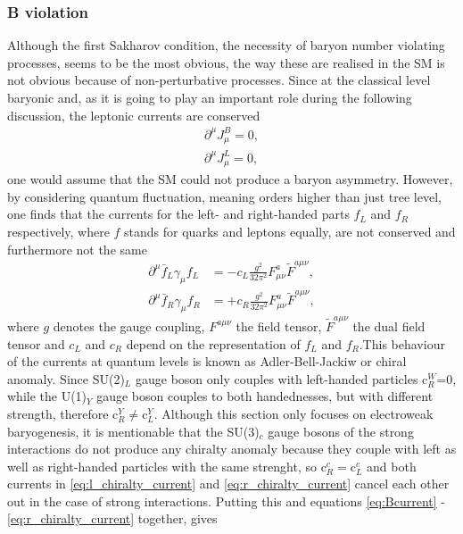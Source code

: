 \subsubsection{B violation}
Although the first Sakharov condition, the necessity of baryon number violating processes, seems to be the most obvious, the way these are realised in the SM is not obvious because of non-perturbative processes. \newline\indent
Since at the classical level baryonic and, as it is going to play an important role during the following discussion, the leptonic currents are  conserved
\begin{align}
	\partial^\mu J_\mu^B=0,
	\label{eq:Bcurrent}
	\\
	\partial^\mu J_\mu^L=0,
	\label{eq:Lcurrent}
\end{align}
one would assume that the SM could not produce a baryon asymmetry. However, by considering quantum fluctuation, meaning orders higher than just tree level, one finds that the currents for the left- and right-handed parts $f_L$ and $f_R$ respectively, where $f$ stands for quarks and leptons equally, are not conserved and furthermore not the same \cite{Bernreuther:2002uj}
\begin{align}
	\partial^\mu\bar{f}_L\gamma_\mu f_L&=-c_L\frac{g^2}{32\pi^2}F^a_{\mu\nu}\tilde{F}^{a\mu\nu},
	\label{eq:l_chiralty_current}
	\\
	\partial^\mu\bar{f}_R\gamma_\mu f_R&=+c_R\frac{g^2}{32\pi^2}F^a_{\mu\nu}\tilde{F}^{a\mu\nu},
	\label{eq:r_chiralty_current}
\end{align}
where $g$ denotes the gauge coupling, $F^{a\mu\nu}$ the field tensor, $\tilde{F}^{a\mu\nu}$ the dual field tensor and $c_L$ and $c_R$ depend on the representation of $f_L$ and $f_R$.This behaviour of the currents at quantum levels is known as Adler-Bell-Jackiw or chiral anomaly. 
Since SU(2)$_L$ gauge boson only couples with left-handed particles c$_R^W$=0, while the U(1)$_Y$ gauge boson couples to both handednesses, but with different strength, therefore c$_R^Y\neq$c$_L^Y$. Although this section only focuses on electroweak baryogenesis, it is mentionable that the SU(3)$_c$ gauge bosons of the strong interactions do not produce any chiralty anomaly because they couple with left as well as right-handed particles with the same strenght, so c$_R^c=$c$_L^c$ and both currents in \eqref{eq:l_chiralty_current} and \eqref{eq:r_chiralty_current} cancel each other out in the case of strong interactions. \newline\indent
Putting this and equations \eqref{eq:Bcurrent} - \eqref{eq:r_chiralty_current} together, gives
